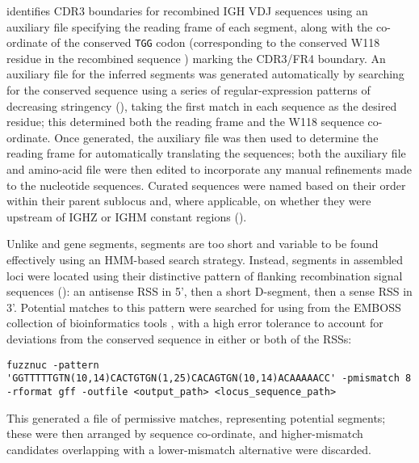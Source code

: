  \parencite{ye2013igblast} identifies CDR3 boundaries for recombined IGH VDJ sequences using an auxiliary file specifying the reading frame of each \jh segment, along with the co-ordinate of the conserved \texttt{TGG} codon (corresponding to the conserved W118 residue in the recombined sequence \parencite{lefranc2014immunoglobulins}) marking the CDR3/FR4 boundary. An auxiliary file for the inferred \jh segments was generated automatically by searching for the conserved sequence using a series of regular-expression patterns of decreasing stringency (), taking the first match in each sequence as the desired residue; this determined both the reading frame and the W118 sequence co-ordinate. Once generated, the auxiliary file was then used to determine the reading frame for automatically translating the \jh sequences; both the auxiliary file and amino-acid  file were then edited to incorporate any manual refinements made to the \jh nucleotide sequences. Curated \jh sequences were named based on their order within their parent sublocus and, where applicable, on whether they were upstream of IGHZ or IGHM constant regions ().

\subsubsubsection{\dh}

\noindent Unlike \vh and \jh gene segments, \dh segments are too short and variable to be found effectively using an HMM-based search strategy. Instead, \dh segments in assembled loci were located using their distinctive pattern of flanking recombination signal sequences (): an antisense RSS in 5', then a short D-segment, then a sense RSS in 3'. Potential matches to this pattern were searched for using  from the EMBOSS collection of bioinformatics tools \parencite{rice2000emboss}, with a high error tolerance to account for deviations from the conserved sequence in either or both of the RSSs:

\begin{lstlisting}
fuzznuc -pattern 'GGTTTTTGTN(10,14)CACTGTGN(1,25)CACAGTGN(10,14)ACAAAAACC' -pmismatch 8 -rformat gff -outfile <output_path> <locus_sequence_path>
\end{lstlisting}

\noindent This generated a  file of permissive matches, representing potential \dh segments; these were then arranged by sequence co-ordinate, and higher-mismatch candidates overlapping with a lower-mismatch alternative were discarded.

